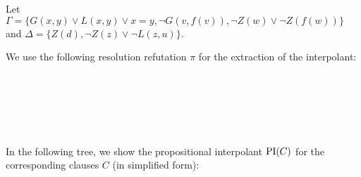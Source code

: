 \begin{exa}
	Let $\Gamma = \{ G(x, y) \lor L(x, y) \lor x = y, \lnot G(v, f(v)), \lnot Z(w) \lor \lnot Z(f(w)) \}$
	and 
	$\Delta = \{ Z(d), \lnot Z(z) \lor \lnot L(z, u) \}$.

	We use the following resolution refutation $\pi$ for the extraction of the interpolant:

	{ %

		~


		\begin{adjustwidth}{8em}{0em}
			\def\defaultHypSeparation{\hskip 1.4em}
			\def\ScoreOverhang{-0em}
			\begin{prooftree}



				\RightLabelm{\resrule{\resrulefac}{\id}}


				\insertBetweenHyps{\hskip -9em}


				\insertBetweenHyps{\hskip -10em}

				\RightLabelm{\resrule{\resruleres}{\id}}
				\BinaryInfCm{  \square }
			\end{prooftree}
		\end{adjustwidth}
		~

		~
	}

	In the following tree, we show the propositional interpolant $\operatorname{PI}(C)$ for the corresponding clauses $C$ (in simplified form):
	{
		\def\defaultHypSeparation{\hskip 4.4em}
		\begin{prooftree}

			\AxiomCm{ \top  }

			\AxiomCm{ \bot}
			\AxiomCm{ \top }
			\BinaryInfCm{  L(x, y) }

			\AxiomCm{ \bot}
			\AxiomCm{ \top }
			\BinaryInfCm{ \lnot Z(d) }


\end{prooftree}}
\end{exa}

